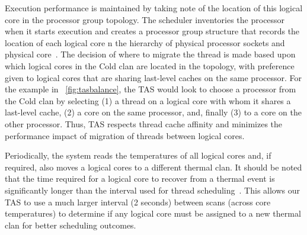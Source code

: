 Execution performance is maintained by taking note of the location of
this logical core in the processor group topology.  The scheduler
inventories the processor when it starts execution and creates a
processor group structure that records the location of each logical core
n the hierarchy of physical processor sockets and physical
core~\cite{McKusick2004b}.  The decision of where to migrate the thread
is made based upon which logical cores in the Cold clan are located in
the topology, with preference given to logical cores that are sharing
last-level caches on the same processor.  For the example in
\figurename~\ref{fig:tasbalance}, the TAS would look to choose a
processor from the Cold clan by selecting (1) a thread on a logical core
with whom it shares a last-level cache, (2) a core on the same
processor, and, finally (3) to a core on the other processor.  Thus, TAS
respects thread cache affinity and minimizes the performance impact of
migration of threads between logical cores.

Periodically, the system reads the temperatures of all logical cores
and, if required, also moves a logical cores to a different thermal
clan.  It should be noted that the time required for a logical core to
recover from a thermal event is significantly longer than the interval
used for thread scheduling~\cite{Choi2007}. This allows our TAS to use a
much larger interval (2 seconds) between scans (across core
temperatures) to determine if any logical core must be assigned to a new
thermal clan for better scheduling outcomes.

